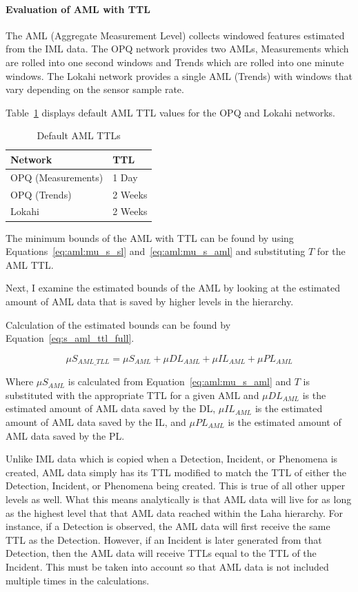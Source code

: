 \paragraph{Evaluation of AML with TTL}
The AML (Aggregate Measurement Level) collects windowed features estimated from the IML data. The OPQ network provides two AMLs, Measurements which are rolled into one second windows and Trends which are rolled into one minute windows. The Lokahi network provides a single AML (Trends) with windows that vary depending on the sensor sample rate.

Table~\ref{table:ttls_aml} displays default AML TTL values for the OPQ and Lokahi networks.

\begin{table}[H]
	\centering
	\caption{Default AML TTLs}
	\begin{tabularx}{\textwidth}{Xl}
		\toprule
		\textbf{Network} & \textbf{TTL} \\
		\midrule
		OPQ (Measurements) & 1 Day \\
        OPQ (Trends) & 2 Weeks \\
        Lokahi & 2 Weeks \\
		\bottomrule
	\end{tabularx}
	\label{table:ttls_aml}
\end{table}

The minimum bounds of the AML with TTL can be found by using Equations~\ref{eq:aml:mu_s_sl} and~\ref{eq:aml:mu_s_aml} and substituting $T$ for the AML TTL\@.

Next, I examine the estimated bounds of the AML by looking at the estimated amount of AML data that is saved by higher levels in the hierarchy.

Calculation of the estimated bounds can be found by Equation~\ref{eq:s_aml_ttl_full}.

\begin{equation}\label{eq:s_aml_ttl_full}
	\mu S_{AML\_TLL} = \mu S_{AML} + \mu DL_{AML} + \mu IL_{AML} + \mu PL_{AML}
\end{equation}

Where $\mu S_{AML}$ is calculated from Equation~\ref{eq:aml:mu_s_aml} and $T$ is substituted with the appropriate TTL for a given AML and $\mu DL_{AML}$ is the estimated amount of AML data saved by the DL, $\mu IL_{AML}$ is the estimated amount of AML data saved by the IL, and $\mu PL_{AML}$ is the estimated amount of AML data saved by the PL\@.

Unlike IML data which is copied when a Detection, Incident, or Phenomena is created, AML data simply has its TTL modified to match the TTL of either the Detection, Incident, or Phenomena being created. This is true of all other upper levels as well. What this means analytically is that AML data will live for as long as the highest level that that AML data reached within the Laha hierarchy. For instance, if a Detection is observed, the AML data will first receive the same TTL as the Detection. However, if an Incident is later generated from that Detection, then the AML data will receive TTLs equal to the TTL of the Incident. This must be taken into account so that AML data is not included multiple times in the calculations.

